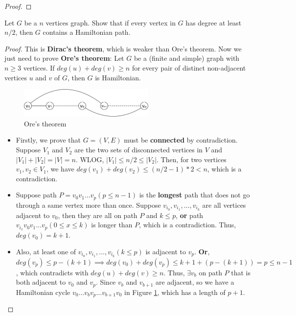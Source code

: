 \documentclass{article}
\newcounter{exercise}
\newcommand{\<}{
    \langle}
\renewcommand{\>}{
    \rangle}
\begin{document}
{\begin{proof}
\end{proof}




\begin{exercise}
Let $G$ be a $n$ vertices graph. Show that if every vertex in $G$ has degree at least $n/2$, then $G$ contains a Hamiltonian path.
\end{exercise}
\begin{proof} This is \textbf{Dirac's theorem}, which is weaker than Ore's theorem. Now we just need to prove \textbf{Ore's theorem}: Let $G$ be a (finite and simple) graph with $n \geq 3$ vertices. If $deg(u)+deg(v) \geq n$ for every pair of distinct non-adjacent vertices $u$ and $v$ of $G$, then $G$ is Hamiltonian.
    
    \begin{figure}[!htp]
        \centering
        \includegraphics[width=0.6\textwidth]{img/3.pdf}
        \caption{Ore's theorem}
        \label{fig:3}
      \end{figure}
    \begin{itemize}
        \item Firstly, we prove that $G=(V,E)$ must be \textbf{connected} by contradiction. Suppose $V_1$ and $V_2$ are the two sets of disconnected vertices in $V$ and $|V_1|+|V_2|=|V|=n$. WLOG, $|V_1| \leq n/2 \leq |V_2|$. Then, for two vertices $v_1,v_2 \in V_1$, we have $deg(v_1)+deg(v_2) \leq (n/2-1)*2 < n$, which is a contradiction.
        
        \item Suppose path $P=v_0 v_1 \ldots v_p(p\leq n-1)$ is the \textbf{longest} path that does not go through a same vertex more than once. Suppose $v_{i_0},v_{i_1},\ldots,v_{i_k}$ are all vertices adjacent to $v_0$, then they are all on path $P$ and $k\leq p$, \textbf{or} path $v_{i_x}v_0v_1\ldots v_p(0\leq x\leq k)$ is longer than $P$, which is a contradiction. Thus, $deg(v_0)=k+1$.
        
        \item Also, at least one of $v_{i_0},v_{i_1},\ldots,v_{i_k} (k\leq p)$ is adjacent to $v_p$. \textbf{Or}, $deg(v_p)\leq p-(k+1)\implies deg(v_0)+deg(v_p)\leq k+1+(p-(k+1))=p\leq n-1$, which contradicts with $deg(u)+deg(v) \geq n$. Thus, $\exists v_b$ on path $P$ that is both adjacent to $v_0$ and $v_p$. Since $v_b$ and $v_{b+1}$ are adjacent, so we have a Hamiltonian cycle $v_0 \ldots v_b v_p \ldots  v_{b+1} v_0$ in Figure \ref{fig:3}, which has a length of $p+1$.
        

\end{itemize}
\end{proof}}
\end{document}
